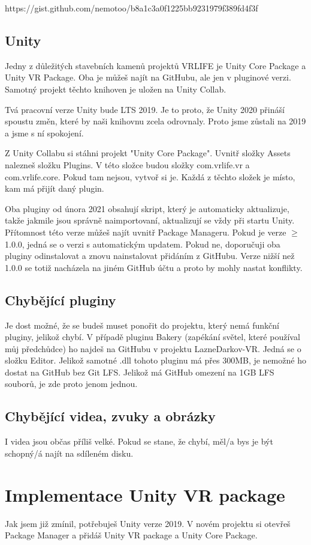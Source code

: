\documentclass{article}
\begin{document}
https://gist.github.com/nemotoo/b8a1c3a0f1225bb9231979f389fd4f3f

\subsection{Unity}
Jedny z důležitých stavebních kamenů projektů VRLIFE je Unity Core Package a Unity VR Package. Oba je můžeš najít na GitHubu, ale jen v pluginové verzi. Samotný projekt těchto knihoven je uložen na Unity Collab.

Tvá pracovní verze Unity bude LTS 2019. Je to proto, že Unity 2020 přináší spoustu změn, které by naši knihovnu zcela odrovnaly. Proto jsme zůstali na 2019 a jsme s ní spokojení.

Z Unity Collabu si stáhni projekt "Unity Core Package". Uvnitř složky Assets nalezneš složku Plugins. V této složce budou složky com.vrlife.vr a com.vrlife.core. Pokud tam nejsou, vytvoř si je. Každá z těchto složek je místo, kam má přijít daný plugin.

Oba pluginy od února 2021 obsahují skript, který je automaticky aktualizuje, takže jakmile jsou správně naimportovaní, aktualizují se vždy při startu Unity. Přítomnost této verze můžeš najít uvnitř Package Manageru. Pokud je verze $\geq$ 1.0.0, jedná se o verzi s automatickým updatem. Pokud ne, doporučuji oba pluginy odinstalovat a znovu nainstalovat přidáním z GitHubu. Verze nižší než 1.0.0 se totiž nacházela na jiném GitHub účtu a proto by mohly nastat konflikty.

\subsection{Chybějící pluginy}
Je dost možné, že se budeš muset ponořit do projektu, který nemá funkční pluginy, jelikož chybí. V případě pluginu Bakery (zapékání světel, které používal můj předchůdce) ho najdeš na GitHubu v projektu LazneDarkov-VR. Jedná se o složku Editor. Jelikož samotné .dll tohoto pluginu má přes 300MB, je nemožné ho dostat na GitHub bez Git LFS. Jelikož má GitHub omezení na 1GB LFS souborů, je zde proto jenom jednou.

\subsection{Chybějící videa, zvuky a obrázky}
I videa jsou občas příliš velké. Pokud se stane, že chybí, měl/a bys je být schopný/á najít na sdíleném disku.
\pagebreak

\section{Implementace Unity VR package}
Jak jsem již zmínil, potřebuješ Unity verze 2019. V novém projektu si otevřeš Package Manager a přidáš Unity VR package a Unity Core Package.
\end{document}
